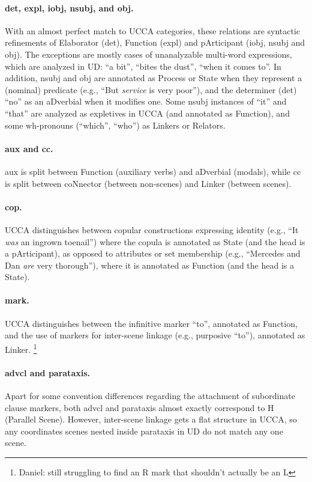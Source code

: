 \documentclass[11pt,a4paper]{article}
\newcommand{\daniel}[1]{\footnote{\color{blue}Daniel: #1}}
\begin{document}
\paragraph{det, expl, iobj, nsubj, and obj.}
With an almost perfect match to UCCA categories,
these relations are syntactic refinements of
Elaborator (det), Function (expl) and pArticipant (iobj, nsubj and obj).
The exceptions are mostly cases of unanalyzable multi-word expressions,
which are analyzed in UD: ``a bit'', ``bites the dust'', ``when it comes to''.
In addition, nsubj and obj are annotated as Process or State when they
represent a (nominal) predicate (e.g., ``But \textit{service} is very poor''),
and the determiner (det) ``no'' as an aDverbial when it modifies one.
Some nsubj instances of ``it'' and ``that''
are analyzed as expletives in UCCA (and annotated as Function),
and some wh-pronouns (``which'', ``who'') as Linkers or Relators.

\paragraph{aux and cc.}
aux is split between Function (auxiliary verbs) and aDverbial (modals),
while cc is split between coNnector (between non-scenes) and Linker (between scenes).

\paragraph{cop.}
UCCA distinguishes between copular constructions expressing
identity (e.g., ``It \textit{was} an ingrown toenail'') where the copula is annotated as State
(and the head is a pArticipant),
as opposed to attributes or set membership
(e.g., ``Mercedes and Dan \textit{are} very thorough''), where it is annotated as Function
(and the head is a State).

\paragraph{mark.}
UCCA distinguishes between the infinitive marker ``to'', annotated as Function,
and the use of markers for inter-scene linkage (e.g., purposive ``to''), annotated as Linker.
\daniel{still struggling to find an R mark that shouldn't actually be an L}

\paragraph{advcl and parataxis.}
Apart for some convention differences regarding the attachment of subordinate clause markers,
both advcl and parataxis almost exactly correspond to H (Parallel Scene).
However, inter-scene linkage gets a flat structure in UCCA,
so any coordinates scenes nested inside parataxis in UD do not match any one scene.
\end{document}
